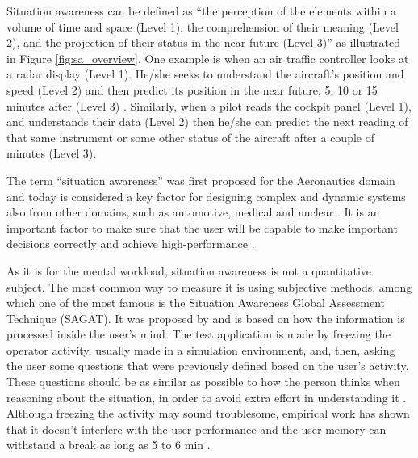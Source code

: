 Situation awareness can be defined as “the perception of the elements within a volume of time and space (Level 1), the comprehension of their meaning (Level 2), and the projection of their status in the near future (Level 3)” as illustrated in Figure \ref{fig:sa_overview}. One example is when an air traffic controller looks at a radar display (Level 1). He/she seeks to understand the aircraft’s position and speed (Level 2) and then predict its position in the near future, 5, 10 or 15 minutes after (Level 3) \cite{sanders1998human}. Similarly, when a pilot reads the cockpit panel (Level 1), and understands their data (Level 2) then he/she can predict the next reading of that same instrument or some other status of the aircraft after a couple of minutes (Level 3).

The term “situation awareness” was first proposed for the Aeronautics domain and today is considered a key factor for designing complex and dynamic systems also from other domains, such as automotive, medical and nuclear \cite{endsley1995measurement}. It is an important factor to make sure that the user will be capable to make important decisions correctly and achieve high-performance \cite{endsley1988design, endsley2018automation}.



As it is for the mental workload, situation awareness is not a quantitative subject. The most common way to measure it is using subjective methods, among which one of the most famous is the Situation Awareness Global Assessment Technique (SAGAT). It was proposed by \cite{endsley1988design} and is based on how the information is processed inside the user’s mind. The test application is made by freezing the operator activity, usually made in a simulation environment, and, then, asking the user some questions that were previously defined based on the user’s activity. These questions should be as similar as possible to how the person thinks when reasoning about the situation, in order to avoid extra effort in understanding it \cite{stanton2004handbook}.  Although freezing the activity may sound troublesome, empirical work has shown that it doesn’t interfere with the user performance and the user memory can withstand a break as long as 5 to 6 min \cite{endsley1988design}.
